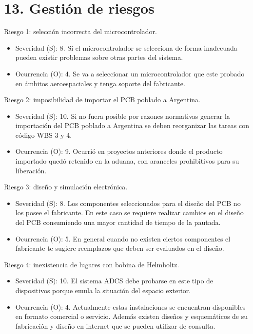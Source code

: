 \documentclass[
11pt, %
]{charter}
\begin{document}
\section{13. Gestión de riesgos}
\label{sec:riesgos}

Riesgo 1: selección incorrecta del microcontrolador.  
\begin{itemize}
	 \item Severidad (S): 8.
	 \newline Si el microcontrolador se selecciona de forma inadecuada pueden existir problemas sobre otras partes del sistema.  
	 \item Ocurrencia (O): 4.\newline 
	 	Se  va a seleccionar un microcontrolador que este probado en ámbitos aeroespaciales y  tenga soporte del fabricante.
\end{itemize}

Riesgo 2: imposibilidad de importar el PCB poblado a Argentina.
\begin{itemize}
	\item Severidad (S): 10.
	\newline Si no fuera posible por razones normativas generar la importación del PCB poblado a Argentina se deben reorganizar las tareas con código WBS 3 y 4.
	\item Ocurrencia (O): 9.\newline 
	Ocurrió en proyectos anteriores donde el producto importado quedó retenido en la aduana, con aranceles prohibitivos para su liberación. 
\end{itemize}


Riesgo 3: diseño y simulación electrónica. 
\begin{itemize}
	\item Severidad (S): 8.
	\newline 
	Los componentes seleccionados para el diseño del PCB no los posee el fabricante. En este caso se requiere realizar cambios en el diseño del PCB consumiendo una mayor cantidad de tiempo de la pautada.  
	\item Ocurrencia (O): 5.\newline 
	En general cuando no existen ciertos componentes el fabricante te sugiere reemplazos que deben ser  evaluados en el diseño. 
\end{itemize}

Riesgo 4: inexistencia de lugares con bobina de Helmholtz.
\begin{itemize}
	\item Severidad (S): 10.
	\newline El sistema ADCS debe probarse en este tipo de dispositivos porque emula la situación del espacio exterior.   
	\item Ocurrencia (O): 4.\newline 
	Actualmente estas instalaciones se encuentran disponibles en formato comercial o servicio. Además existen diseños y esquemáticos de su fabricación y diseño en internet que se pueden utilizar de consulta. 
\end{itemize}
\end{document}
